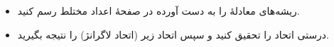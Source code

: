 \begin{EMunit}


\end{EMunit}

\begin{EMexercise}{}

\begin{itemize}
\tightlist
\item
  ریشه‌های معادلهٔ  را به دست آورده در صفحهٔ اعداد مختلط رسم کنید.
\item
  درستی اتحاد  را تحقیق کنید و سپس اتحاد زیر (اتحاد لاگرانژ) را نتیجه بگیرید.
\end{itemize}

\end{EMexercise}
